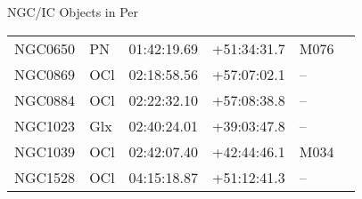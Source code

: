 \begin{block}{NGC/IC Objects in Per}
  \centering
  \begin{tabularx}{\textwidth}{llrrll} \toprule 
    NGC0650 & PN & 01:42:19.69 & +51:34:31.7  & M076 \\ 
    NGC0869 & OCl & 02:18:58.56 & +57:07:02.1  & -- \\ 
    NGC0884 & OCl & 02:22:32.10 & +57:08:38.8  & -- \\ 
    NGC1023 & Glx & 02:40:24.01 & +39:03:47.8  & -- \\ 
    NGC1039 & OCl & 02:42:07.40 & +42:44:46.1  & M034 \\ 
    NGC1528 & OCl & 04:15:18.87 & +51:12:41.3  & -- \\ 
  \end{tabularx}
\end{block}